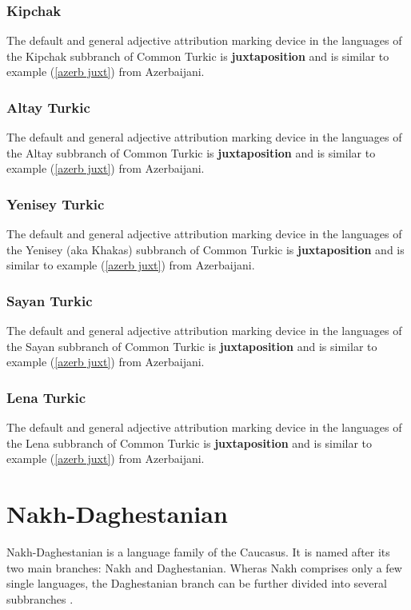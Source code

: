 \subsubsection{Kipchak}
The default and general adjective attribution marking device in the languages of the Kipchak subbranch of Common Turkic is \textbf{juxtaposition} and is  similar to example (\ref{azerb juxt}) from Azerbaijani.

\subsubsection{Altay Turkic}
The default and general adjective attribution marking device in the languages of the Altay subbranch of Common Turkic is \textbf{juxtaposition}  and is similar to example (\ref{azerb juxt}) from Azerbaijani.

\subsubsection{Yenisey Turkic}
The default and general adjective attribution marking device in the languages of the Yenisey (aka Khakas) subbranch of Common Turkic is \textbf{juxtaposition}  and is similar to example (\ref{azerb juxt}) from Azerbaijani.

\subsubsection{Sayan Turkic}
The default and general adjective attribution marking device in the languages of the Sayan subbranch of Common Turkic is \textbf{juxtaposition}  and is similar to example (\ref{azerb juxt}) from Azerbaijani.

\subsubsection{Lena Turkic}
The default and general adjective attribution marking device in the languages of the Lena subbranch of Common Turkic is \textbf{juxtaposition}  and is similar to example (\ref{azerb juxt}) from Azerbaijani.

\section{Nakh-Daghestanian}
Nakh-Daghestanian is a language family of the Caucasus. It is named after its two main branches: Nakh and Daghestanian. Wheras Nakh comprises only a few single languages, the Daghestanian branch can be further divided into several subbranches \cite[220, 233]{salminen2007}.\\

